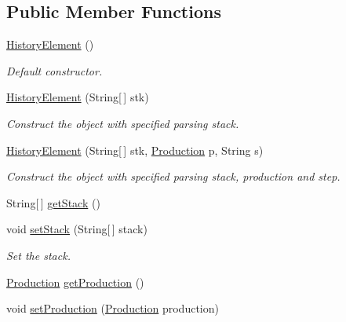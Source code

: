 \subsection*{Public Member Functions}
\begin{DoxyCompactItemize}
\item 
\hypertarget{classparser_program_1_1_history_element_a45f360f314f688585844a62592bdb5c5}{\hyperlink{classparser_program_1_1_history_element_a45f360f314f688585844a62592bdb5c5}{History\-Element} ()}\label{classparser_program_1_1_history_element_a45f360f314f688585844a62592bdb5c5}

\begin{DoxyCompactList}\small\item\em Default constructor. \end{DoxyCompactList}\item 
\hyperlink{classparser_program_1_1_history_element_ae6d3bdd3606301f0b08d4e9258b5c5cf}{History\-Element} (String\mbox{[}$\,$\mbox{]} stk)
\begin{DoxyCompactList}\small\item\em Construct the object with specified parsing stack. \end{DoxyCompactList}\item 
\hyperlink{classparser_program_1_1_history_element_a0cd8852d35a48856c6e893ae33cbde30}{History\-Element} (String\mbox{[}$\,$\mbox{]} stk, \hyperlink{classcontext_free_1_1grammar_1_1_production}{Production} p, String s)
\begin{DoxyCompactList}\small\item\em Construct the object with specified parsing stack, production and step. \end{DoxyCompactList}\item 
String\mbox{[}$\,$\mbox{]} \hyperlink{classparser_program_1_1_history_element_a8f20a699af1fa68f114acef0f72117b5}{get\-Stack} ()
\item 
void \hyperlink{classparser_program_1_1_history_element_a640ecb265a57f1b084fe99cf2a2a9a35}{set\-Stack} (String\mbox{[}$\,$\mbox{]} stack)
\begin{DoxyCompactList}\small\item\em Set the stack. \end{DoxyCompactList}\item 
\hyperlink{classcontext_free_1_1grammar_1_1_production}{Production} \hyperlink{classparser_program_1_1_history_element_a1e3354d1bc805c952c4ed9a35ddac0dd}{get\-Production} ()
\item 
void \hyperlink{classparser_program_1_1_history_element_a2311f48be369f4d0e6be47c2a7ac7546}{set\-Production} (\hyperlink{classcontext_free_1_1grammar_1_1_production}{Production} production)

\end{DoxyCompactItemize}
